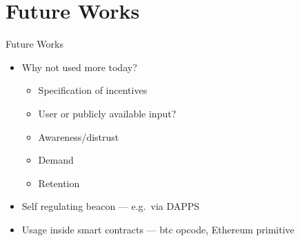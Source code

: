 \section{Future Works}

\begin{frame}{Future Works}
    \begin{itemize}
        \item<1-> Why not used more today?
            \begin{itemize}
                \item Specification of incentives
                \item User or publicly available input?
                \item Awareness/distrust
                \item Demand
                \item Retention
            \end{itemize}
        \item<2-> Self regulating beacon --- e.g.\ via DAPPS
        \item<3-> Usage inside smart contracts --- btc opcode, Ethereum primitive
    \end{itemize}
\end{frame}
